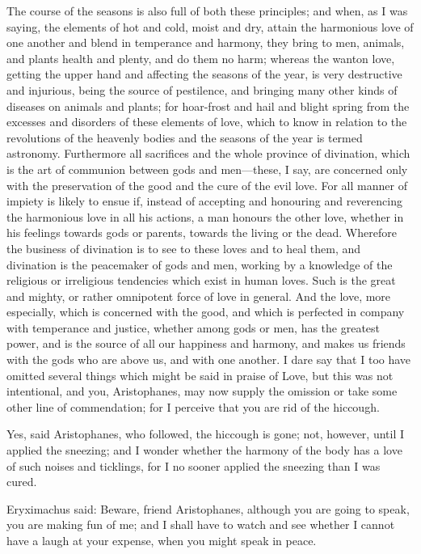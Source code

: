 \para[59] The course of the seasons is also full of both these principles; and when, as I was saying, the elements of hot and cold, moist and dry, attain the harmonious love of one another and blend in temperance and harmony, they bring to men, animals, and plants health and plenty, and do them no harm; whereas the wanton love, getting the upper hand and affecting the seasons of the year, is very destructive and injurious, being the source of pestilence, and bringing many other kinds of diseases on animals and plants; for hoar-frost and hail and blight spring from the excesses and disorders of these elements of love, which to know in relation to the revolutions of the heavenly bodies and the seasons of the year is termed astronomy. Furthermore all sacrifices and the whole province of divination, which is the art of communion between gods and men---these, I say, are concerned only with the preservation of the good and the cure of the evil love. For all manner of impiety is likely to ensue if, instead of accepting and honouring and reverencing the harmonious love in all his actions, a man honours the other love, whether in his feelings towards gods or parents, towards the living or the dead. Wherefore the business of divination is to see to these loves and to heal them, and divination is the peacemaker of gods and men, working by a knowledge of the religious or irreligious tendencies which exist in human loves. Such is the great and mighty, or rather omnipotent force of love in general. And the love, more especially, which is concerned with the good, and which is perfected in company with temperance and justice, whether among gods or men, has the greatest power, and is the source of all our happiness and harmony, and makes us friends with the gods who are above us, and with one another. I dare say that I too have omitted several things which might be said in praise of Love, but this was not intentional, and you, Aristophanes, may now supply the omission or take some other line of commendation; for I perceive that you are rid of the hiccough.

\para[60] Yes, said Aristophanes, who followed, the hiccough is gone; not, however, until I applied the sneezing; and I wonder whether the harmony of the body has a love of such noises and ticklings, for I no sooner applied the sneezing than I was cured.

\para[61] Eryximachus said: Beware, friend Aristophanes, although you are going to speak, you are making fun of me; and I shall have to watch and see whether I cannot have a laugh at your expense, when you might speak in peace.

